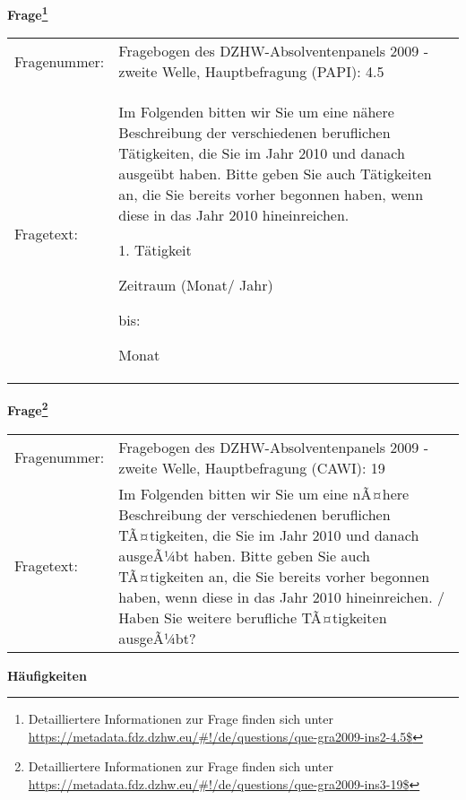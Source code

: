 				\vspace*{0.5cm}
                \noindent\textbf{Frage\footnote{Detailliertere Informationen zur Frage finden sich unter
		              \url{https://metadata.fdz.dzhw.eu/\#!/de/questions/que-gra2009-ins2-4.5$}}}\\
				\begin{tabularx}{\hsize}{@{}lX}
					Fragenummer: &
					  Fragebogen des DZHW-Absolventenpanels 2009 - zweite Welle, Hauptbefragung (PAPI):
					  4.5
 \\
					Fragetext: & Im Folgenden bitten wir Sie um eine nähere Beschreibung der verschiedenen beruflichen Tätigkeiten, die Sie im Jahr 2010 und danach ausgeübt haben. Bitte geben Sie auch Tätigkeiten an, die Sie bereits vorher begonnen haben, wenn diese in das Jahr 2010 hineinreichen.\par  1. Tätigkeit\par  Zeitraum (Monat/ Jahr)\par  bis:\par  Monat \\
				\end{tabularx}
				\vspace*{0.5cm}
                \noindent\textbf{Frage\footnote{Detailliertere Informationen zur Frage finden sich unter
		              \url{https://metadata.fdz.dzhw.eu/\#!/de/questions/que-gra2009-ins3-19$}}}\\
				\begin{tabularx}{\hsize}{@{}lX}
					Fragenummer: &
					  Fragebogen des DZHW-Absolventenpanels 2009 - zweite Welle, Hauptbefragung (CAWI):
					  19
 \\
					Fragetext: & Im Folgenden bitten wir Sie um eine nÃ¤here Beschreibung der verschiedenen beruflichen TÃ¤tigkeiten, die Sie im Jahr 2010 und danach ausgeÃ¼bt haben. Bitte geben Sie auch TÃ¤tigkeiten an, die Sie bereits vorher begonnen haben, wenn diese in das Jahr 2010 hineinreichen. / Haben Sie weitere berufliche TÃ¤tigkeiten ausgeÃ¼bt? \\
				\end{tabularx}





        		\vspace*{0.5cm}
                \noindent\textbf{Häufigkeiten}

